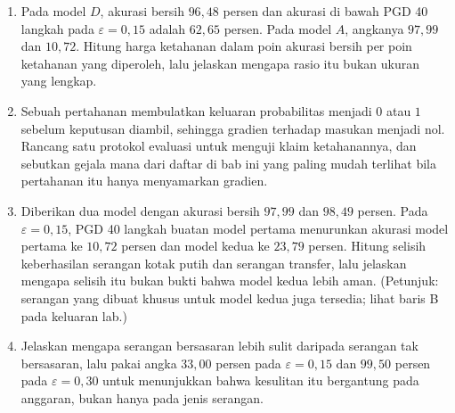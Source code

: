 \begin{latihan}
\begin{enumerate}
  \item Pada model $D$, akurasi bersih $96{,}48$ persen dan akurasi di bawah PGD 40
        langkah pada $\varepsilon=0{,}15$ adalah $62{,}65$ persen. Pada model $A$,
        angkanya $97{,}99$ dan $10{,}72$. Hitung harga ketahanan dalam poin akurasi
        bersih per poin ketahanan yang diperoleh, lalu jelaskan mengapa rasio itu
        bukan ukuran yang lengkap.

  \item Sebuah pertahanan membulatkan keluaran probabilitas menjadi $0$ atau $1$
        sebelum keputusan diambil, sehingga gradien terhadap masukan menjadi nol.
        Rancang satu protokol evaluasi untuk menguji klaim ketahanannya, dan sebutkan
        gejala mana dari daftar di bab ini yang paling mudah terlihat bila pertahanan
        itu hanya menyamarkan gradien.

  \item Diberikan dua model dengan akurasi bersih $97{,}99$ dan $98{,}49$ persen.
        Pada $\varepsilon=0{,}15$, PGD 40 langkah buatan model pertama menurunkan
        akurasi model pertama ke $10{,}72$ persen dan model kedua ke $23{,}79$
        persen. Hitung selisih keberhasilan serangan kotak putih dan serangan
        transfer, lalu jelaskan mengapa selisih itu bukan bukti bahwa model kedua
        lebih aman. (Petunjuk: serangan yang dibuat khusus untuk model kedua juga
        tersedia; lihat baris B pada keluaran lab.)

  \item Jelaskan mengapa serangan bersasaran lebih sulit daripada serangan tak
        bersasaran, lalu pakai angka $33{,}00$ persen pada $\varepsilon=0{,}15$ dan
        $99{,}50$ persen pada $\varepsilon=0{,}30$ untuk menunjukkan bahwa kesulitan
        itu bergantung pada anggaran, bukan hanya pada jenis serangan.
\end{enumerate}
\end{latihan}


